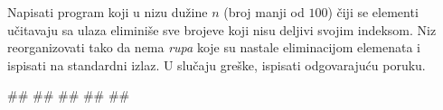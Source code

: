 \begin{Exercise}[label=vp.zadatak_bez_resenja_12] 
Napisati program koji u nizu dužine $n$ (broj manji od $100$) čiji se elementi učitavaju sa ulaza eliminiše sve brojeve koji nisu deljivi svojim indeksom. Niz reorganizovati tako da nema
\emph{rupa} koje su nastale eliminacijom elemenata i ispisati na standardni izlaz. U slučaju greške, ispisati odgovarajuću poruku. 
\begin{miditest}
\begin{upotreba}{1}
#\naslovInt#
##
##
##
##
\end{upotreba}
\end{miditest}
\end{Exercise}
\begin{Answer}[ref=vp.zadatak_bez_resenja_12]
\end{Answer}


